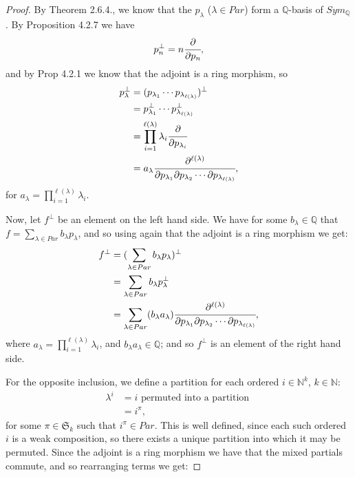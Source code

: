 \documentclass[8pt]{extarticle}
\newcommand{\N}{\mathbb{N}}
\newcommand{\Q}{\mathbb{Q}}
\newcommand{\<}{\langle}
\renewcommand{\>}{\rangle}
\theoremstyle{definition}
\begin{document}
\begin{proof}
  By Theorem 2.6.4., we know that the $p_\lambda$ ($\lambda \in Par$) form a $\Q$-basis of $Sym_\Q$. By Proposition 4.2.7 we have
  \begin{align*}
    p_n^{\perp} = n \cfrac{\partial}{\partial p_n},
  \end{align*}
  and by Prop 4.2.1 we know that the adjoint is a ring morphism, so
  \begin{align*}
    p_{\lambda}^{\perp} &=
    (p_{\lambda_1} \cdots p_{\lambda_{\ell(\lambda)}})^{\perp} \\
    &= p_{\lambda_1}^{\perp} \cdots p_{\lambda_{\ell(\lambda)}}^{\perp} \\
    &= \prod_{i=1}^{\ell(\lambda)} \lambda_i \cfrac{\partial}{\partial p_{\lambda_i}} \\
    &= a_{\lambda} \cfrac{\partial^{\ell(\lambda)}}{\partial p_{\lambda_1}\partial p_{\lambda_2} \cdots \partial p_{\lambda_{\ell(\lambda)}}},
  \end{align*}
  for $a_{\lambda} = \prod\limits_{i=1}^{\ell(\lambda)} \lambda_i$. 

  Now, let $f^{\perp}$ be an element on the left hand side. We have for some $b_\lambda \in \Q$ that $f = \sum\limits_{\lambda \in Par} b_{\lambda} p_{\lambda}$, and so using again that the adjoint is a ring morphism we get:
  \begin{align*}
    f^{\perp}
    &=
    (\sum\limits_{\lambda \in Par} b_{\lambda} p_{\lambda})^{\perp}
    \\
    &=
    \sum\limits_{\lambda \in Par} b_{\lambda} p_{\lambda}^{\perp}    \\
    &=
    \sum\limits_{\lambda \in Par} (b_{\lambda} a_{\lambda}) \cfrac{\partial^{\ell(\lambda)}}{\partial p_{\lambda_1}\partial p_{\lambda_2} \cdots \partial p_{\lambda_{\ell(\lambda)}}}, 
  \end{align*}
  where $a_{\lambda} = \prod\limits_{i=1}^{\ell(\lambda)} \lambda_i$, and $b_{\lambda} a_{\lambda} \in \Q$; and so $f^{\perp}$ is an element of the right hand side.

  For the opposite inclusion, we define a partition for each ordered $i \in \N^k$, $k \in \N$:
  \begin{align*}
    \lambda^i
    &= i \text{ permuted into a partition } \\
    &= i^{\pi},
  \end{align*}
  for some $\pi \in \mathfrak{S}_k$ such that $i^{\pi} \in Par$. This is well defined, since each such ordered $i$ is a weak composition, so there exists a unique partition into which it may be permuted. Since the adjoint is a ring morphism we have that the mixed partials commute, and so rearranging terms we get:
  

\end{proof}
\end{document}

